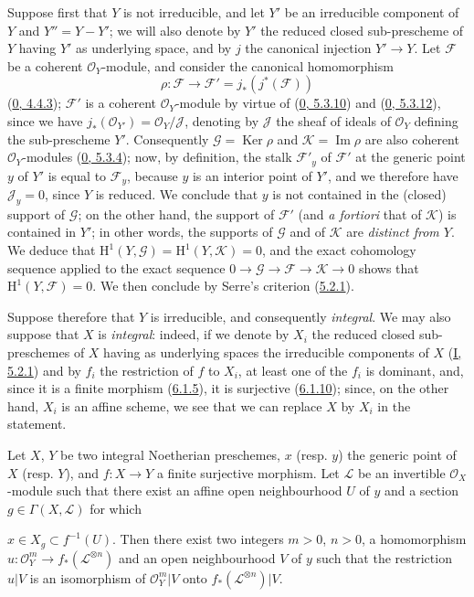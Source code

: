 Suppose first that $Y$ is not irreducible, and let $Y'$ be an irreducible
component of $Y$ and $Y''=Y-Y'$; we will also denote by
$Y'$ the reduced closed sub-prescheme of $Y$ having $Y'$ as underlying
space, and by $j$ the canonical injection $Y'\to Y$. Let $\mathcal{F}$
be a coherent $\mathcal{O}_Y$-module, and consider the canonical homomorphism
\[
\rho:\mathcal{F}\longrightarrow
\mathcal{F}'=j_*(j^*(\mathcal{F}))
\]
(\hyperref[0.4.4.3]{0, 4.4.3}); $\mathcal{F}'$ is a coherent
$\mathcal{O}_Y$-module by virtue of
(\hyperref[0.5.3.10]{0, 5.3.10}) and
(\hyperref[0.5.3.12]{0, 5.3.12}), since we have
$j_*(\mathcal{O}_{Y'})=\mathcal{O}_Y/\mathcal{J}$, denoting by
$\mathcal{J}$ the sheaf of ideals of $\mathcal{O}_Y$ defining the
sub-prescheme $Y'$. Consequently $\mathcal{G}=\operatorname{Ker}\rho$ and
$\mathcal{K}=\operatorname{Im}\rho$ are also coherent $\mathcal{O}_Y$-modules
(\hyperref[0.5.3.4]{0, 5.3.4}); now, by definition, the stalk
$\mathcal{F}'_y$ of $\mathcal{F}'$ at the generic point $y$ of $Y'$ is equal
to $\mathcal{F}_y$, because $y$ is an interior point of $Y'$, and we therefore
have $\mathcal{J}_y=0$, since $Y$ is reduced. We conclude that $y$ is not
contained in the (closed) support of $\mathcal{G}$; on the other hand, the
support of $\mathcal{F}'$ (and \emph{a fortiori} that of $\mathcal{K}$) is
contained in $Y'$; in other words, the supports of $\mathcal{G}$ and of
$\mathcal{K}$ are \emph{distinct from $Y$}. We deduce that
$\mathrm{H}^1(Y,\mathcal{G})=\mathrm{H}^1(Y,\mathcal{K})=0$, and the exact
cohomology sequence applied to the exact sequence
$0\to\mathcal{G}\to\mathcal{F}\to\mathcal{K}\to0$ shows that
$\mathrm{H}^1(Y,\mathcal{F})=0$. We then conclude by Serre's criterion
(\hyperref[II.5.2.1]{5.2.1}).

Suppose therefore that $Y$ is irreducible, and consequently \emph{integral}.
We may also suppose that $X$ is \emph{integral}: indeed, if we denote by $X_i$
the reduced closed sub-preschemes of $X$ having as underlying spaces the
irreducible components of $X$ (\hyperref[I.5.2.1]{I, 5.2.1}) and by
$f_i$ the restriction of $f$ to $X_i$, at least one of the $f_i$ is dominant,
and, since it is a finite morphism (\hyperref[II.6.1.5]{6.1.5}), it is
surjective (\hyperref[II.6.1.10]{6.1.10}); since, on the other hand, $X_i$ is
an affine scheme, we see that we can replace $X$ by $X_i$ in the statement.

\begin{lemma}[6.7.1.1]
\label{II.6.7.1.1}
Let $X$, $Y$ be two integral Noetherian preschemes, $x$ (resp. $y$) the
generic point of $X$ (resp. $Y$), and $f:X\to Y$ a finite surjective morphism.
Let $\mathcal{L}$ be an invertible $\mathcal{O}_X$-module such that there
exist an affine open neighbourhood $U$ of $y$ and a section
$g\in\Gamma(X,\mathcal{L})$ for which


$x\in X_g\subset f^{-1}(U)$. Then there exist two integers $m>0$, $n>0$, a
homomorphism
$u:\mathcal{O}_Y^m\to f_*(\mathcal{L}^{\otimes n})$ and an open neighbourhood
$V$ of $y$ such that the restriction $u|V$ is an isomorphism of
$\mathcal{O}_Y^m|V$ onto $f_*(\mathcal{L}^{\otimes n})|V$.
\end{lemma}

